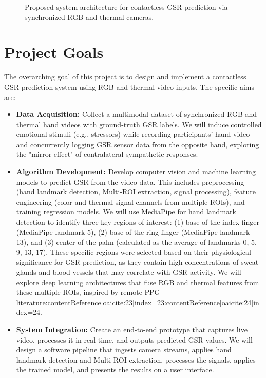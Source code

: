 \documentclass[12pt]{article}
\begin{document}
    \begin{figure}[ht]
        \centering
        \caption{Proposed system architecture for contactless GSR prediction via synchronized RGB and thermal cameras.}
        \label{fig:architecture}
    \end{figure}


    \section{Project Goals}
    The overarching goal of this project is to design and implement a contactless GSR prediction system using RGB and thermal video inputs. The specific aims are:
    \begin{itemize}
        \item \textbf{Data Acquisition:} Collect a multimodal dataset of synchronized RGB and thermal hand videos with ground-truth GSR labels. We will induce controlled emotional stimuli (e.g., stressors) while recording participants' hand video and concurrently logging GSR sensor data from the opposite hand, exploring the "mirror effect" of contralateral sympathetic responses.
        \item \textbf{Algorithm Development:} Develop computer vision and machine learning models to predict GSR from the video data. This includes preprocessing (hand landmark detection, Multi-ROI extraction, signal processing), feature engineering (color and thermal signal channels from multiple ROIs), and training regression models. We will use MediaPipe for hand landmark detection to identify three key regions of interest: (1) base of the index finger (MediaPipe landmark 5), (2) base of the ring finger (MediaPipe landmark 13), and (3) center of the palm (calculated as the average of landmarks 0, 5, 9, 13, 17). These specific regions were selected based on their physiological significance for GSR prediction, as they contain high concentrations of sweat glands and blood vessels that may correlate with GSR activity. We will explore deep learning architectures that fuse RGB and thermal features from these multiple ROIs, inspired by remote PPG literature:contentReference[oaicite:23]{index=23}:contentReference[oaicite:24]{index=24}.
        \item \textbf{System Integration:} Create an end-to-end prototype that captures live video, processes it in real time, and outputs predicted GSR values. We will design a software pipeline that ingests camera streams, applies hand landmark detection and Multi-ROI extraction, processes the signals, applies the trained model, and presents the results on a user interface.

\end{itemize}
\end{document}
